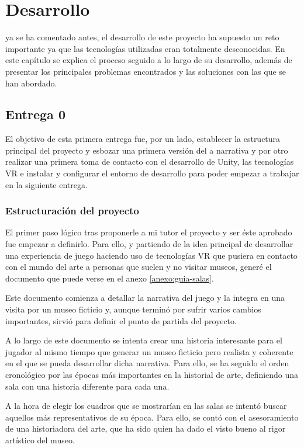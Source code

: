\chapter{Desarrollo}
\label{chap:desarrollo}

 ya se ha comentado antes, el desarrollo de este proyecto ha supuesto un reto importante ya que las tecnologías utilizadas eran totalmente desconocidas. En este capítulo se explica el proceso seguido a lo largo de su desarrollo, además de presentar los principales problemas encontrados y las soluciones con las que se han abordado.

\section{Entrega 0}

El objetivo de esta primera entrega fue, por un lado, establecer la estructura principal del proyecto y esbozar una primera versión del a narrativa y por otro realizar una primera toma de contacto con el desarrollo de Unity, las tecnologías \acs{VR} e instalar y configurar el entorno de desarrollo para poder empezar a trabajar en la siguiente entrega.

\subsection{Estructuración del proyecto}

El primer paso lógico tras proponerle a mi tutor el proyecto y ser éste aprobado fue empezar a definirlo. Para ello, y partiendo de la idea principal de desarrollar una experiencia de juego haciendo uso de tecnologías \acs{VR} que pusiera en contacto con el mundo del arte a personas que suelen y no visitar museos, generé el documento que puede verse en el anexo \ref{anexo:guia-salas}. 

Este documento comienza a detallar la narrativa del juego y la integra en una visita por un museo ficticio y, aunque terminó por sufrir varios cambios importantes, sirvió para definir el punto de partida del proyecto.

A lo largo de este documento se intenta crear una historia interesante para el jugador al mismo tiempo que generar un museo ficticio pero realista y coherente en el que se pueda desarrollar dicha narrativa. Para ello, se ha seguido el orden cronológico por las épocas más importantes en la historial de arte, definiendo una sala con una historia diferente para cada una.

A la hora de elegir los cuadros que se mostrarían en las salas se intentó buscar aquellos más representativos de su época. Para ello, se contó con el asesoramiento de una historiadora del arte, que ha sido quien ha dado el visto bueno al rigor artístico del museo.


